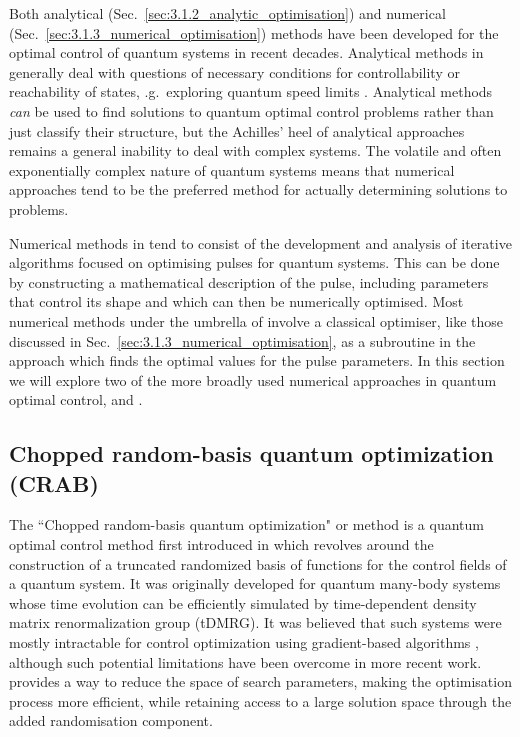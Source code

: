 Both analytical (Sec.~\ref{sec:3.1.2_analytic_optimisation}) and numerical (Sec.~\ref{sec:3.1.3_numerical_optimisation}) methods have been developed for the optimal control of quantum systems in recent decades. Analytical methods in  generally deal with questions of necessary conditions for controllability \cite{schirmer_complete_2001} or reachability of states, \@e.g.~exploring quantum speed limits \cite{khaneja_time_2001, hegerfeldt_driving_2013, poggi_quantum_2013}. Analytical methods \emph{can} be used to find solutions to quantum optimal control problems rather than just classify their structure, but the Achilles' heel of analytical approaches remains a general inability to deal with complex systems. The volatile and often exponentially complex nature of quantum systems means that numerical approaches tend to be the preferred method for actually determining solutions to  problems. 

Numerical methods in  tend to consist of the development and analysis of iterative algorithms focused on optimising pulses for quantum systems. This can be done by constructing a mathematical description of the pulse, including parameters that control its shape and which can then be numerically optimised. Most numerical methods under the umbrella of  involve a classical optimiser, like those discussed in Sec.~\ref{sec:3.1.3_numerical_optimisation}, as a subroutine in the approach which finds the optimal values for the pulse parameters. In this section we will explore two of the more broadly used numerical approaches in quantum optimal control,  and . 

\subsection{Chopped random-basis quantum optimization (CRAB)}\label{sec:3.3.1_CRAB}

The ``Chopped random-basis quantum optimization" or  method is a quantum optimal control method first introduced in \cite{doria_optimal_2011, caneva_chopped_2011} which revolves around the construction of a truncated randomized basis of functions for the control fields of a quantum system. It was originally developed for quantum many-body systems whose time evolution can be efficiently simulated by time-dependent density matrix renormalization group (tDMRG)\cite{white_density_1992, schollwock_density-matrix_2005, schollwock_density-matrix_2011}. It was believed that such systems were mostly intractable for control optimization using gradient-based algorithms \cite{brif_control_2010}, although such potential limitations have been overcome in more recent work\cite{jensen_approximate_2021}.  provides a way to reduce the space of search parameters, making the optimisation process more efficient, while retaining access to a large solution space through the added randomisation component.

